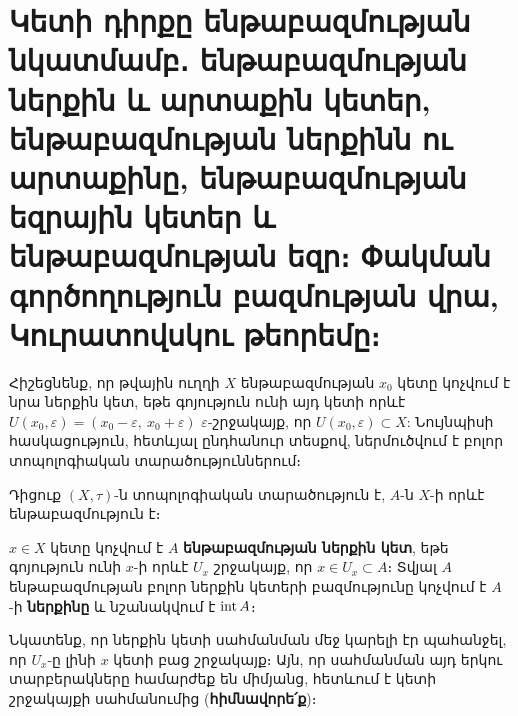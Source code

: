 \documentclass[./main.tex]{subfiles}
\begin{document}
\onehalfspacing


\section{Կետի դիրքը ենթաբազմության նկատմամբ․ ենթաբազմության ներքին և արտաքին կետեր, ենթաբազմության ներքինն ու արտաքինը, ենթաբազմության եզրային կետեր և ենթաբազմության եզր։ Փակման գործողություն բազմության վրա, Կուրատովսկու թեորեմը։}\label{sec:6}

\par Հիշեցնենք, որ թվային ուղղի $X$ ենթաբազմության $x_0$ կետը կոչվում է նրա ներքին կետ, եթե գոյություն ունի այդ կետի որևէ $U(x_0, \varepsilon) = (x_0 - \varepsilon,\ x_0 + \varepsilon)$ $\varepsilon$-շրջակայք, որ $U(x_0, \varepsilon) \subset X$: Նույնպիսի հասկացություն, հետևյալ ընդհանուր տեսքով, ներմուծվում է բոլոր տոպոլոգիական տարածություններում։

\par Դիցուք $(X, \tau)$-ն տոպոլոգիական տարածություն է, $A$-ն $X$-ի որևէ ենթաբազմու\-թյուն է։

\begin{definition}
$x \in X$ կետը կոչվում է $A$ \textbf{ենթաբազմության ներքին կետ}, եթե գոյություն ունի $x$-ի որևէ $U_x$ շրջակայք, որ $x\in U_x \subset A$։ Տվյալ $A$ ենթաբազմության բոլոր ներքին կետերի բազմությունը կոչվում է $A$-ի \textbf{ներքինը} և նշանակվում է $\operatorname{int} A$։
\end{definition}

\par Նկատենք, որ ներքին կետի սահմանման մեջ կարելի էր պահանջել, որ $U_x$-ը լինի $x$ կետի բաց շրջակայք։ Այն, որ սահմանման այդ երկու տարբերակները համարժեք են միմյանց, հետևում է կետի շրջակայքի սահմանումից (\textbf{հիմնավորե՛ք})։
\end{document}
